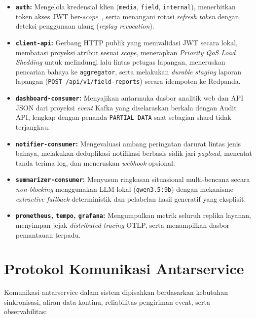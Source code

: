 \begin{itemize}
    \item \textbf{\texttt{auth}:} Mengelola kredensial klien (\texttt{media}, \texttt{field}, \texttt{internal}), menerbitkan token akses JWT ber-\textit{scope}~\cite{rfc7519}, serta menangani rotasi \textit{refresh token} dengan deteksi penggunaan ulang (\textit{replay revocation}).
    \item \textbf{\texttt{client-api}:} Gerbang HTTP publik yang memvalidasi JWT secara lokal, membatasi proyeksi atribut sesuai \textit{scope}, menerapkan \textit{Priority QoS Load Shedding} untuk melindungi lalu lintas petugas lapangan, meneruskan pencarian bahaya ke \texttt{aggregator}, serta melakukan \textit{durable staging} laporan lapangan (\texttt{POST /api/v1/field-reports}) secara idempoten ke Redpanda.
    \item \textbf{\texttt{dashboard-consumer}:} Menyajikan antarmuka dasbor analitik web dan API JSON dari proyeksi \textit{event} Kafka yang diselaraskan berkala dengan Audit API, lengkap dengan penanda \texttt{PARTIAL DATA} saat sebagian shard tidak terjangkau.
    \item \textbf{\texttt{notifier-consumer}:} Mengevaluasi ambang peringatan darurat lintas jenis bahaya, melakukan deduplikasi notifikasi berbasis sidik jari \textit{payload}, mencatat tanda terima log, dan meneruskan \textit{webhook} opsional.
    \item \textbf{\texttt{summarizer-consumer}:} Menyusun ringkasan situasional multi-bencana secara \textit{non-blocking} menggunakan LLM lokal (\texttt{qwen3.5:9b}) dengan mekanisme \textit{extractive fallback} deterministik dan pelabelan hasil generatif yang eksplisit.
    \item \textbf{\texttt{prometheus}, \texttt{tempo}, \texttt{grafana}:} Mengumpulkan metrik seluruh replika layanan, menyimpan jejak \textit{distributed tracing} OTLP, serta menampilkan dasbor pemantauan terpadu.
\end{itemize}

\section{Protokol Komunikasi Antarservice}
Komunikasi antarservice dalam sistem dipisahkan berdasarkan kebutuhan sinkronisasi, aliran data kontinu, reliabilitas pengiriman event, serta observabilitas:

